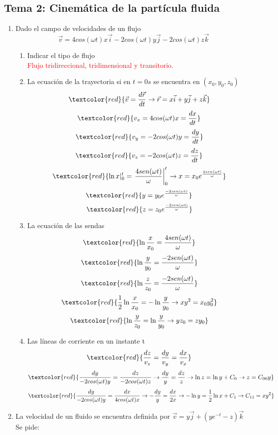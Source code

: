 \subsection{Tema 2: Cinemática de la partícula fluida}
\begin{enumerate}
	\item Dado el campo de velocidades de un flujo
	\[\vec{v}=4cos(\omega t)x\vec{i}-2cos(\omega t)y\vec{j}-2cos(\omega t)z\vec{k}\]
	\begin{enumerate}
		\item Indicar el tipo de flujo\\
		\textcolor{red}{Flujo tridireccional, tridimensional y transitorio.}
		\item La ecuación de la trayectoria si en $t=0s$ se encuentra en $(x_0,y_0,z_0)$
		\[\textcolor{red}{\vec{v}=\frac{d\vec{r}}{dt} \rightarrow \vec{r}=x\vec{i}+y\vec{j}+z\vec{k}}\]
		\[\textcolor{red}{v_x=4cos(\omega t)x=\frac{dx}{dt}}\]
		\[\textcolor{red}{v_y= -2cos(\omega t)y = \frac{dy}{dt}}\]
		\[\textcolor{red}{v_z= -2cos(\omega t)z = \frac{dz}{dt}} \]
		\[\textcolor{red}{\ln x|_0^t=\left.{\frac{4sen(\omega t)}{\omega}}\right |_0^t \rightarrow x=x_0 e^{\frac{4sen(\omega t)}{\omega}}}\]
		\[\textcolor{red}{y=y_0 e^{\frac{-2sen(\omega t)}{\omega}}}\]
		\[\textcolor{red}{z=z_0 e^{\frac{-2sen(\omega t)}{\omega}}}\]
		\item La ecuación de las sendas
		\[\textcolor{red}{\ln \frac{x}{x_0}=\frac{4sen(\omega t)}{\omega}}\]
		\[\textcolor{red}{\ln \frac{y}{y_0}=\frac{-2sen(\omega t)}{\omega}}\]
		\[\textcolor{red}{\ln \frac{z}{z_0}=\frac{-2sen(\omega t)}{\omega}}\]
		\[\textcolor{red}{\frac{1}{2}\ln \frac{x}{x_0}=-\ln \frac{y}{y_0} \rightarrow xy^2=x_0y_0^2}\]
		\[\textcolor{red}{\ln \frac{y}{z_0}=\ln \frac{y}{y_0} \rightarrow yz_0=zy_0}\]
		\item Las líneas de corriente en un instante t
		\[\textcolor{red}{\frac{dz}{v_z}=\frac{dy}{v_y}=\frac{dx}{v_x}}\]
		\[\textcolor{red}{\frac{dy}{-2cos(\omega t)y}=\frac{dz}{-2cos(\omega t)z}\rightarrow \frac{dy}{y}=\frac{dz}{z}\rightarrow \ln z = \ln y + C_0 \rightarrow z=C_{00}y}\]
		\[\textcolor{red}{\frac{dy}{-2cos(\omega t)y}=\frac{dx}{4cos(\omega t)x}\rightarrow -\frac{dy}{y}=\frac{dx}{2x}\rightarrow -\ln y = \frac{1}{2}\ln x + C_1 \rightarrow C_{11}=xy^2 }\]
	\end{enumerate}
	\item La velocidad de un fluido se encuentra definida por $\vec{v}=y\vec{j}+\left(ye^{-t}-z\right)\vec{k}$ Se pide:
	\begin{enumerate}

\end{enumerate}
\end{enumerate}
